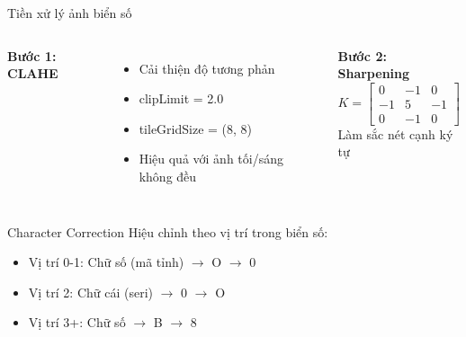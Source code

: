 \begin{frame}{Tiền xử lý ảnh biển số}
    \begin{columns}
        \textbf{Bước 1: CLAHE}
        \begin{itemize}
            \item Cải thiện độ tương phản
            \item clipLimit = 2.0
            \item tileGridSize = (8, 8)
            \item Hiệu quả với ảnh tối/sáng không đều
        \end{itemize}

        \textbf{Bước 2: Sharpening}
        $$ K = \begin{bmatrix} 0 & -1 & 0 \\ -1 & 5 & -1 \\ 0 & -1 & 0 \end{bmatrix} $$
        Làm sắc nét cạnh ký tự
    \end{columns}

    \vspace{0.5em}
    \begin{block}{Character Correction}
    Hiệu chỉnh theo vị trí trong biển số:
    \begin{itemize}
        \item Vị trí 0-1: Chữ số (mã tỉnh) $\rightarrow$ O $\rightarrow$ 0
        \item Vị trí 2: Chữ cái (seri) $\rightarrow$ 0 $\rightarrow$ O
        \item Vị trí 3+: Chữ số $\rightarrow$ B $\rightarrow$ 8
    \end{itemize}
    \end{block}
\end{frame}

